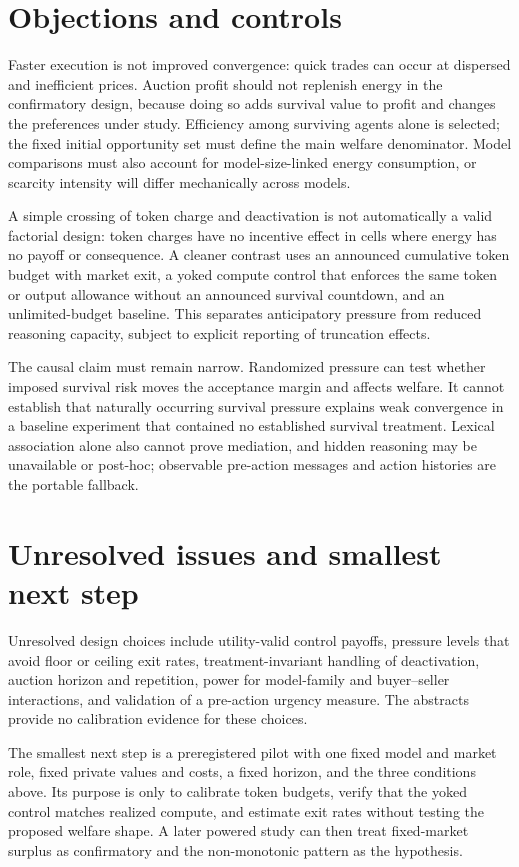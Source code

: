 \documentclass{article}
\begin{document}
\section{Objections and controls}

Faster execution is not improved convergence: quick trades can occur at dispersed and inefficient prices. Auction profit should not replenish energy in the confirmatory design, because doing so adds survival value to profit and changes the preferences under study. Efficiency among surviving agents alone is selected; the fixed initial opportunity set must define the main welfare denominator. Model comparisons must also account for model-size-linked energy consumption, or scarcity intensity will differ mechanically across models. 

A simple crossing of token charge and deactivation is not automatically a valid factorial design: token charges have no incentive effect in cells where energy has no payoff or consequence. A cleaner contrast uses an announced cumulative token budget with market exit, a yoked compute control that enforces the same token or output allowance without an announced survival countdown, and an unlimited-budget baseline. This separates anticipatory pressure from reduced reasoning capacity, subject to explicit reporting of truncation effects. 

The causal claim must remain narrow. Randomized pressure can test whether imposed survival risk moves the acceptance margin and affects welfare. It cannot establish that naturally occurring survival pressure explains weak convergence in a baseline experiment that contained no established survival treatment. Lexical association alone also cannot prove mediation, and hidden reasoning may be unavailable or post-hoc; observable pre-action messages and action histories are the portable fallback. 

\section{Unresolved issues and smallest next step}

Unresolved design choices include utility-valid control payoffs, pressure levels that avoid floor or ceiling exit rates, treatment-invariant handling of deactivation, auction horizon and repetition, power for model-family and buyer--seller interactions, and validation of a pre-action urgency measure. The abstracts provide no calibration evidence for these choices. 

The smallest next step is a preregistered pilot with one fixed model and market role, fixed private values and costs, a fixed horizon, and the three conditions above. Its purpose is only to calibrate token budgets, verify that the yoked control matches realized compute, and estimate exit rates without testing the proposed welfare shape. A later powered study can then treat fixed-market surplus as confirmatory and the non-monotonic pattern as the hypothesis. 
\end{document}
